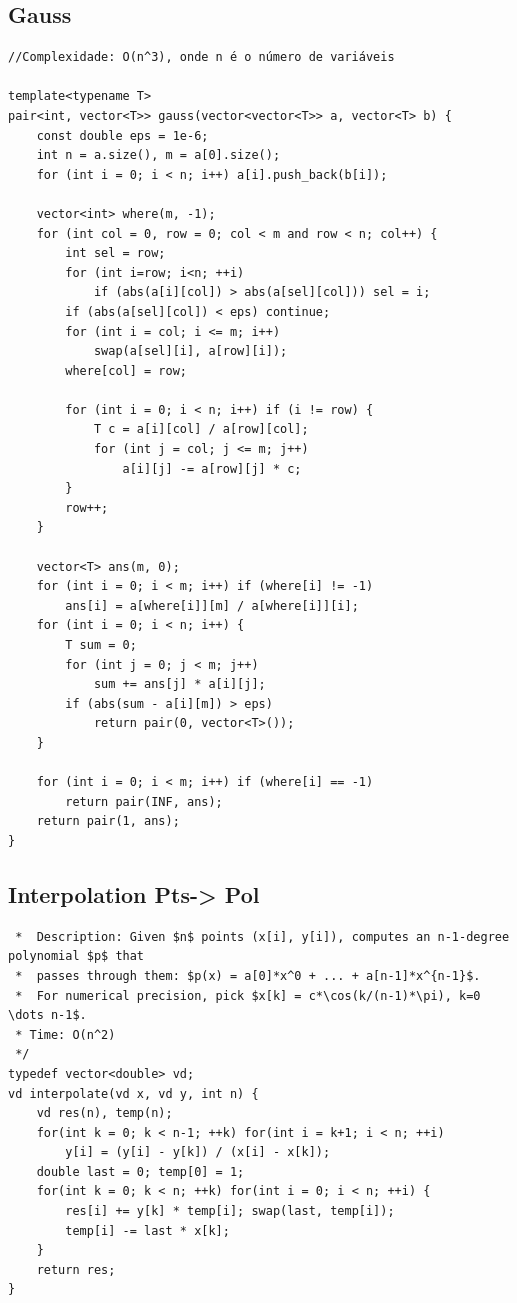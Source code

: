 \documentclass[11pt, a4paper, twoside]{article}
\begin{document}
\subsection{Gauss}
\begin{verbatim}
//Complexidade: O(n^3), onde n é o número de variáveis

template<typename T>
pair<int, vector<T>> gauss(vector<vector<T>> a, vector<T> b) {
	const double eps = 1e-6;
	int n = a.size(), m = a[0].size();
	for (int i = 0; i < n; i++) a[i].push_back(b[i]);
    
	vector<int> where(m, -1);
	for (int col = 0, row = 0; col < m and row < n; col++) {
		int sel = row;
		for (int i=row; i<n; ++i)
			if (abs(a[i][col]) > abs(a[sel][col])) sel = i;
		if (abs(a[sel][col]) < eps) continue;
		for (int i = col; i <= m; i++)
			swap(a[sel][i], a[row][i]);
		where[col] = row;
    
		for (int i = 0; i < n; i++) if (i != row) {
			T c = a[i][col] / a[row][col];
			for (int j = col; j <= m; j++)
				a[i][j] -= a[row][j] * c;
		}
		row++;
	}
    
	vector<T> ans(m, 0);
	for (int i = 0; i < m; i++) if (where[i] != -1)
		ans[i] = a[where[i]][m] / a[where[i]][i];
	for (int i = 0; i < n; i++) {
		T sum = 0;
		for (int j = 0; j < m; j++)
			sum += ans[j] * a[i][j];
		if (abs(sum - a[i][m]) > eps)
			return pair(0, vector<T>());
	}
    
	for (int i = 0; i < m; i++) if (where[i] == -1)
		return pair(INF, ans);
	return pair(1, ans);
}
\end{verbatim}

\subsection{Interpolation Pts-> Pol}
\begin{verbatim}
 *  Description: Given $n$ points (x[i], y[i]), computes an n-1-degree polynomial $p$ that
 *  passes through them: $p(x) = a[0]*x^0 + ... + a[n-1]*x^{n-1}$.
 *  For numerical precision, pick $x[k] = c*\cos(k/(n-1)*\pi), k=0 \dots n-1$.
 * Time: O(n^2)
 */
typedef vector<double> vd;
vd interpolate(vd x, vd y, int n) {
	vd res(n), temp(n);
	for(int k = 0; k < n-1; ++k) for(int i = k+1; i < n; ++i)
		y[i] = (y[i] - y[k]) / (x[i] - x[k]);
	double last = 0; temp[0] = 1;
	for(int k = 0; k < n; ++k) for(int i = 0; i < n; ++i) {
		res[i] += y[k] * temp[i]; swap(last, temp[i]);
		temp[i] -= last * x[k];
	}
	return res;
}
\end{verbatim}
\end{document}
